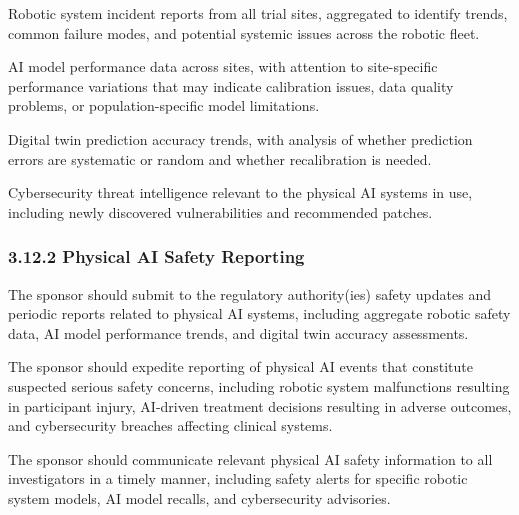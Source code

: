 \documentclass[11pt]{article}
\begin{document}
\begin{description}[leftmargin=2.5cm,style=sameline]

\item[(a)] Robotic system incident reports from all trial sites, aggregated to identify trends, common failure modes, and potential systemic issues across the robotic fleet.

\item[(b)] AI model performance data across sites, with attention to site-specific performance variations that may indicate calibration issues, data quality problems, or population-specific model limitations.

\item[(c)] Digital twin prediction accuracy trends, with analysis of whether prediction errors are systematic or random and whether recalibration is needed.

\item[(d)] Cybersecurity threat intelligence relevant to the physical AI systems in use, including newly discovered vulnerabilities and recommended patches.

\end{description}

\subsubsection{3.12.2 Physical AI Safety Reporting}

\begin{description}[leftmargin=2.5cm,style=sameline]

\item[(a)] The sponsor should submit to the regulatory authority(ies) safety updates and periodic reports related to physical AI systems, including aggregate robotic safety data, AI model performance trends, and digital twin accuracy assessments.

\item[(b)] The sponsor should expedite reporting of physical AI events that constitute suspected serious safety concerns, including robotic system malfunctions resulting in participant injury, AI-driven treatment decisions resulting in adverse outcomes, and cybersecurity breaches affecting clinical systems.

\item[(c)] The sponsor should communicate relevant physical AI safety information to all investigators in a timely manner, including safety alerts for specific robotic system models, AI model recalls, and cybersecurity advisories.

\end{description}
\end{document}
